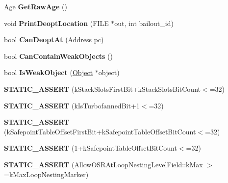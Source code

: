 \begin{DoxyCompactItemize}
\item 
\hypertarget{classv8_1_1internal_1_1_code_a2f1574e315468b97aa67ddaac6d841f9}{}Age {\bfseries Get\+Raw\+Age} ()\label{classv8_1_1internal_1_1_code_a2f1574e315468b97aa67ddaac6d841f9}

\item 
\hypertarget{classv8_1_1internal_1_1_code_a693859845aed19cd5a5e2999bbcb9ab3}{}void {\bfseries Print\+Deopt\+Location} (F\+I\+L\+E $\ast$out, int bailout\+\_\+id)\label{classv8_1_1internal_1_1_code_a693859845aed19cd5a5e2999bbcb9ab3}

\item 
\hypertarget{classv8_1_1internal_1_1_code_a9fec9635426df94d27beabb15ab45dd6}{}bool {\bfseries Can\+Deopt\+At} (Address pc)\label{classv8_1_1internal_1_1_code_a9fec9635426df94d27beabb15ab45dd6}

\item 
\hypertarget{classv8_1_1internal_1_1_code_a11b116ebb4cbb076b68a27c5c28ec997}{}bool {\bfseries Can\+Contain\+Weak\+Objects} ()\label{classv8_1_1internal_1_1_code_a11b116ebb4cbb076b68a27c5c28ec997}

\item 
\hypertarget{classv8_1_1internal_1_1_code_aae581c0f6d5931987c3f35850d7ba08e}{}bool {\bfseries Is\+Weak\+Object} (\hyperlink{classv8_1_1internal_1_1_object}{Object} $\ast$object)\label{classv8_1_1internal_1_1_code_aae581c0f6d5931987c3f35850d7ba08e}

\item 
\hypertarget{classv8_1_1internal_1_1_code_a4c802c523021aa6d359193d1cdcce0fe}{}{\bfseries S\+T\+A\+T\+I\+C\+\_\+\+A\+S\+S\+E\+R\+T} (k\+Stack\+Slots\+First\+Bit+k\+Stack\+Slots\+Bit\+Count$<$=32)\label{classv8_1_1internal_1_1_code_a4c802c523021aa6d359193d1cdcce0fe}

\item 
\hypertarget{classv8_1_1internal_1_1_code_abfb9b6569ecdd29d32f3d65bb29f061f}{}{\bfseries S\+T\+A\+T\+I\+C\+\_\+\+A\+S\+S\+E\+R\+T} (k\+Is\+Turbofanned\+Bit+1$<$=32)\label{classv8_1_1internal_1_1_code_abfb9b6569ecdd29d32f3d65bb29f061f}

\item 
\hypertarget{classv8_1_1internal_1_1_code_a8d3c51b70402e4c101c632bacab6e9b9}{}{\bfseries S\+T\+A\+T\+I\+C\+\_\+\+A\+S\+S\+E\+R\+T} (k\+Safepoint\+Table\+Offset\+First\+Bit+k\+Safepoint\+Table\+Offset\+Bit\+Count$<$=32)\label{classv8_1_1internal_1_1_code_a8d3c51b70402e4c101c632bacab6e9b9}

\item 
\hypertarget{classv8_1_1internal_1_1_code_acd3578a6cab988b1caf816a5eb77a70d}{}{\bfseries S\+T\+A\+T\+I\+C\+\_\+\+A\+S\+S\+E\+R\+T} (1+k\+Safepoint\+Table\+Offset\+Bit\+Count$<$=32)\label{classv8_1_1internal_1_1_code_acd3578a6cab988b1caf816a5eb77a70d}

\item 
\hypertarget{classv8_1_1internal_1_1_code_afcc714273822ccf8e1fcf759c7b03298}{}{\bfseries S\+T\+A\+T\+I\+C\+\_\+\+A\+S\+S\+E\+R\+T} (Allow\+O\+S\+R\+At\+Loop\+Nesting\+Level\+Field\+::k\+Max $>$=k\+Max\+Loop\+Nesting\+Marker)\label{classv8_1_1internal_1_1_code_afcc714273822ccf8e1fcf759c7b03298}

\end{DoxyCompactItemize}
